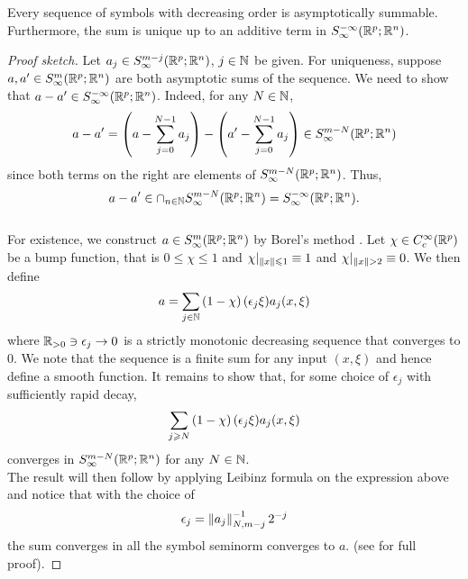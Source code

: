 \documentclass[12pt]{article}
\begin{document}
\begin{flemma}
    Every sequence of symbols with decreasing order is asymptotically summable.  Furthermore, the sum is unique up to an additive term in $S^{-\infty}_\infty(\R^{p}; \R^n)$. 
\end{flemma}
\begin{proof}[Proof sketch]
    Let $a_j \in S^{m-j}_\infty(\R^{p}; \R^n)$, $j \in \N$ be given. For uniqueness, suppose $a, a' \in S^{m}_\infty(\R^{p}; \R^n)$ are both asymptotic sums of the sequence. We need to show that $a - a' \in S^{-\infty}_\infty(\R^{p}; \R^n)$. Indeed, for any $N \in \N$, 
    \begin{align*}
        a - a' = \brac{a - \sum_{j = 0}^{N -1} a_j } - \brac{a' - \sum_{j = 0}^{N -1} a_j } \in S^{m -N}_\infty(\R^{p}; \R^n)
    \end{align*}
    since both terms on the right are elements of $S^{m -N}_\infty(\R^{p}; \R^n)$. Thus, 
    $$a - a' \in \cap_{n \in \N} S^{m -N}_\infty(\R^{p}; \R^n) = S^{-\infty}_\infty(\R^{p}; \R^n).$$ 
    \\
    For existence, we construct $a \in S^{m}_\infty(\R^{p}; \R^n)$ by Borel's method \cite{}. Let $\chi \in C^{\infty}_c(\R^p)$ be a bump function, that is $0 \leq \chi \leq 1$ and $\chi|_{\norm[x] \leq 1} \equiv 1$ and $\chi|_{\norm[x] >2} \equiv 0$. We then define
    \begin{align*}
        a = \sum_{j \in \N} \brac{1 - \chi}(\epsilon_j \xi) a_j(x, \xi)
    \end{align*}
    where $\R_{> 0} \ni \epsilon_j \to 0 $ is a strictly monotonic decreasing sequence that converges to $0$. We note that the sequence is a finite sum for any input $(x, \xi)$ and hence define a smooth function. It remains to show that, for some choice of $\epsilon_j$ with sufficiently rapid decay, 
    \begin{align*}
        \sum_{j \geq N} \brac{1 - \chi}(\epsilon_j \xi) a_j(x, \xi) 
    \end{align*}
    converges in $S^{m -N}_\infty(\R^{p}; \R^n)$ for any $N \in \N$. 
    \\
    The result will then follow by applying Leibinz formula on the expression above and notice that with the choice of 
    \begin{align*}
    \epsilon_j = \norm[a_{j}]_{N, m - j}^{-1} 2^{-j}
    \end{align*}
    the sum converges in all the  symbol seminorm converges to $a$. (see \cite[Chapter 2]{rbm_intro_microlocal} for full proof). 
    
\end{proof}
\end{document}
